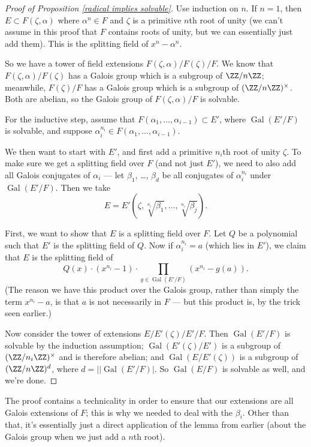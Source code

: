 \begin{proof}[Proof of Proposition \ref{radical implies solvable}]
    Use induction on $n$. If $n = 1$, then $E \subset F(\zeta, \alpha)$ where $\alpha^n \in F$ and $\zeta$ is a primitive $n$th root of unity (we can't assume in this proof that $F$ contains roots of unity, but we can essentially just add them). This is the splitting field of $x^n - \alpha^n$. 

    So we have a tower of field extensions $F(\zeta, \alpha)/F(\zeta)/F$. We know that $F(\zeta, \alpha)/F(\zeta)$ has a Galois group which is a subgroup of $\ZZ/n\ZZ$; meanwhile, $F(\zeta)/F$ has a Galois group which is a subgroup of $(\ZZ/n\ZZ)^\times$. Both are abelian, so the Galois group of $F(\zeta, \alpha)/F$ is solvable. 

    For the inductive step, assume that $F(\alpha_1, \ldots, \alpha_{i - 1}) \subset E'$, where $\operatorname{Gal}(E'/F)$ is solvable, and suppose $\alpha_i^{n_i} \in F(\alpha_1, \ldots, \alpha_{i - 1})$. 
    
    We then want to start with $E'$, and first add a primitive $n_i$th root of unity $\zeta$. To make sure we get a splitting field over $F$ (and not just $E'$), we need to also add all Galois conjugates of $\alpha_i$ --- let $\beta_1$, \ldots, $\beta_d$ be all conjugates of $\alpha_i^{n_i}$ under $\operatorname{Gal}(E'/F)$. Then we take \[E = E'(\zeta, \sqrt[n_i]{\beta_1}, \ldots, \sqrt[n_i]{\beta_j}).\] 
    
    First, we want to show that $E$ is a splitting field over $F$. Let $Q$ be a polynomial such that $E'$ is the splitting field of $Q$. Now if $\alpha_i^{n_i} = a$ (which lies in $E'$), we claim that $E$ is the splitting field of \[Q(x)\cdot (x^{n_i} - 1)\cdot \prod_{g \in \operatorname{Gal}(E'/F)} (x^{n_i} - g(a)).\] (The reason we have this product over the Galois group, rather than simply the term $x^{n_i} - a$, is that $a$ is not necessarily in $F$ --- but this product is, by the trick seen earlier.)  
    
    Now consider the tower of extensions $E/E'(\zeta)/E'/F$. Then $\operatorname{Gal}(E'/F)$ is solvable by the induction assumption; $\operatorname{Gal}(E'(\zeta)/E')$ is a subgroup of $(\ZZ/n_i\ZZ)^\times$ and is therefore abelian; and $\operatorname{Gal}(E/E'(\zeta))$ is a subgroup of $(\ZZ/n\ZZ)^d$, where $d = \lvert| \operatorname{Gal}(E'/F)\rvert$. So $\operatorname{Gal}(E/F)$ is solvable as well, and we're done. 
\end{proof}

\begin{note}
The proof contains a technicality in order to ensure that our extensions are all Galois extensions of $F$; this is why we needed to deal with the $\beta_i$. Other than that, it's essentially just a direct application of the lemma from earlier (about the Galois group when we just add a $n$th root). 
\end{note}

